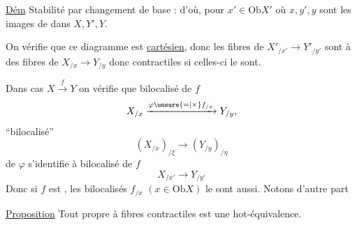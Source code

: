 \uline{Dém} Stabilité par changement de base :
d'où, pour $x'\in\mathrm{Ob}X'$
où $x,y',y$ sont les images de  dans $X,Y',Y$.

On vérifie que ce diagramme est \uline{cartésien}, donc les fibres de $X'_{/x'}\longrightarrow Y'_{/y'}$ sont  à des fibres de $X_{/x}\to Y_{/y}$ donc contractiles si celles-ci le sont.

Dans  cas $X\xrightarrow{f}Y$ on vérifie que    bilocalisé de $f$
\[
 X_{/x}\xrightarrow{\varphi\unsure{=|\times}f_{/x}}Y_{/y},
\]
  ``bilocalisé''
\[
 (X_{/x})_{/\xi}\longrightarrow(Y_{/y})_{/\eta}
\]
 de $\varphi$ s'identifie  à  bilocalisé de $f$
\[
 X_{/x'}\longrightarrow Y_{/y'}
\]
Donc si $f$ est  , les bilocalisés $f_{/x}$ $(x\in\mathrm{Ob}X)$ le sont aussi. Notons d'autre part

\uline{Proposition} Tout  propre  à fibres contractiles est une hot-équivalence.


